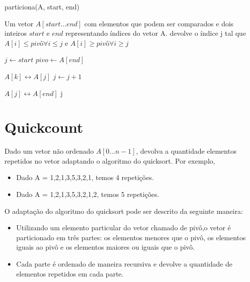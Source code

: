 \begin{algorithm}
\caption{particiona(A, start, end)}
\label{alg::particiona}

\begin{algorithmic}
\Require Um vetor $A[start \ldots end]$ com elementos que podem ser comparados e dois inteiros $start$ e $end$ representando índices do vetor A.
\Ensure devolve o índice j tal que $A[i] \leq pivô \forall i \leq j$ e  $A[i] \geq pivô \forall i \geq j$

\State $j \gets start$
\State $pivo \gets A[end]$

\State $A[k] \leftrightarrow A[j]$
\State $j \gets j + 1$
\EndIf
\EndFor

\State $A[j] \leftrightarrow A[end]$
\State \Return j

\end{algorithmic}
\end{algorithm}

\section{Quickcount}

\begin{exemplo}
Dado um vetor não ordenado $A[0 \ldots n-1]$, devolva a quantidade elementos repetidos no vetor adaptando o algoritmo do quicksort. Por exemplo,

\begin{itemize}
\item Dado A = {1,2,1,3,5,3,2,1}, temos 4 repetições.
\item Dado A = {1,2,1,3,5,3,2,1,2}, temos 5 repetições.
\end{itemize}

\end{exemplo}


O adaptação do algoritmo do quicksort pode ser descrito da seguinte maneira:

\begin{itemize}
    \item Utilizando um elemento particular do vetor chamado de pivô,o vetor é particionado em três partes: os elementos menores que o pivô,  os elementos iguais ao pivô e os elementos maiores ou iguais que o pivô.
    \item Cada parte é ordenado de maneira recursiva e devolve a quantidade de elementos repetidos em cada parte.
\end{itemize}

